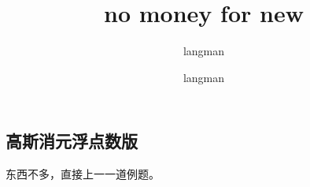\documentclass[a4paper,13.6pt]{article}
\author{langman}
\author{langman}
\title{no money for new}
\begin{document}
\begin{CJK}{UTF8}{gbsn}


\section{高斯消元浮点数版} 
东西不多，直接上一一道例题。
\inputminted{c++}{a.cpp}


\end{CJK}
\end{document}
